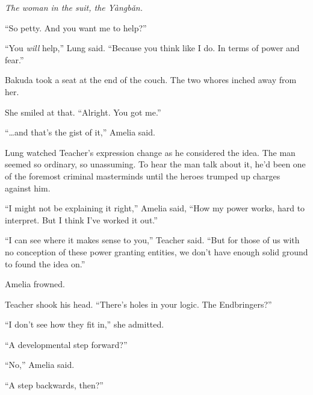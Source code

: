 \emph{The woman in the suit, the Y\`{a}ngb\v{a}n.}



``So petty.  And you want me to help?''



``You \emph{will} help,'' Lung said.  ``Because you think like I do.  In terms of power and fear.''



Bakuda took a seat at the end of the couch.  The two whores inched away from her.



She smiled at that.  ``Alright.  You got me.''



\sectionbreak






``\ldots{}and that's the gist of it,'' Amelia said.



Lung watched Teacher's expression change as he considered the idea.  The man seemed so ordinary, so unassuming.  To hear the man talk about it, he'd been one of the foremost criminal masterminds until the heroes trumped up charges against him.



``I might not be explaining it right,'' Amelia said, ``How my power works, hard to interpret.  But I think I've worked it out.''



``I can see where it makes sense to you,'' Teacher said.  ``But for those of us with no conception of these power granting entities, we don't have enough solid ground to found the idea on.''



Amelia frowned.



Teacher shook his head.  ``There's holes in your logic.  The Endbringers?''



``I don't see how they fit in,'' she admitted.



``A developmental step forward?''



``No,'' Amelia said.



``A step backwards, then?''



